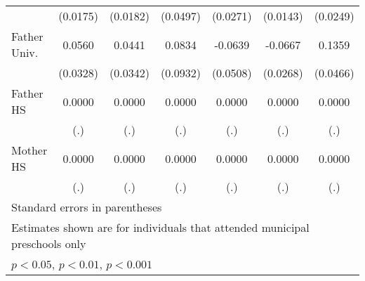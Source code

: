 \begin{table}[htbp]
\begin{tabular}{l*{6}{c}}
            &    (0.0175)         &    (0.0182)         &    (0.0497)         &    (0.0271)         &    (0.0143)         &    (0.0249)         \\
\addlinespace
Father Univ.&      0.0560         &      0.0441         &      0.0834         &     -0.0639         &     -0.0667\sym{*}  &      0.1359\sym{**} \\
            &    (0.0328)         &    (0.0342)         &    (0.0932)         &    (0.0508)         &    (0.0268)         &    (0.0466)         \\
\addlinespace
Father HS   &      0.0000         &      0.0000         &      0.0000         &      0.0000         &      0.0000         &      0.0000         \\
            &         (.)         &         (.)         &         (.)         &         (.)         &         (.)         &         (.)         \\
\addlinespace
Mother HS   &      0.0000         &      0.0000         &      0.0000         &      0.0000         &      0.0000         &      0.0000         \\
            &         (.)         &         (.)         &         (.)         &         (.)         &         (.)         &         (.)         \\
\bottomrule
\multicolumn{7}{l}{\footnotesize Standard errors in parentheses}\\
\multicolumn{7}{l}{\footnotesize Estimates shown are for individuals that attended municipal preschools only}\\
\multicolumn{7}{l}{\footnotesize \sym{*} \(p<0.05\), \sym{**} \(p<0.01\), \sym{***} \(p<0.001\)}\\
\end{tabular}
\end{table}
